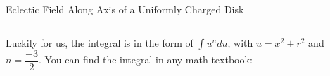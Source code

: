 \documentclass[12pt,aspectratio=169]{beamer}
\begin{document}
\begin{frame}{Eclectic Field Along Axis of a Uniformly Charged Disk}
  \begin{columns}
    
    Luckily for us, the integral is in the form of $\displaystyle\int u^ndu$,
    with $u=x^2+r^2$ and $n=\dfrac{-3}2$. You can find the integral in any math
    textbook:

  \end{columns}
\end{frame}



%
%
%
%
%
%
%    
%
%
%
\end{document}
